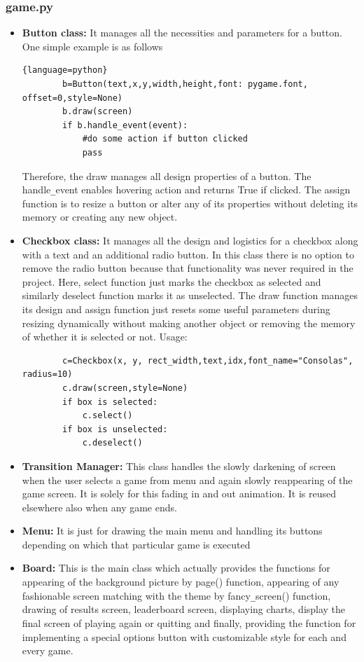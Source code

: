 \documentclass[12pt, a4paper]{article}
\begin{document}
\subsubsection{game.py}
\begin{itemize}
    \item{\textbf{Button class:} It manages all the necessities and parameters for a button. One simple example is as follows
    \begin{lstlisting}{language=python}
        b=Button(text,x,y,width,height,font: pygame.font, offset=0,style=None)
        b.draw(screen)
        if b.handle_event(event):
            #do some action if button clicked
            pass
    \end{lstlisting}
    Therefore, the draw manages all design properties of a button. The handle\texttt{\_}event enables hovering action and returns True if clicked. The assign function is to resize a button or alter any of its properties without deleting its memory or creating any new object.
    }
    \item{\textbf{Checkbox class:}
    It manages all the design and logistics for a checkbox along with a text and an additional radio button. In this class there is no option to remove the radio button because that functionality was never required in the project. Here, select function just marks the checkbox as selected and similarly deselect function marks it as unselected. The draw function manages its design and assign function just resets some useful parameters during resizing dynamically without making another object or removing the memory of whether it is selected or not.
    Usage:
    \begin{lstlisting}
        c=Checkbox(x, y, rect_width,text,idx,font_name="Consolas", radius=10)
        c.draw(screen,style=None)
        if box is selected:
            c.select()
        if box is unselected:
            c.deselect()
    \end{lstlisting}
    }
    \item{\textbf{Transition Manager: }
    This class handles the slowly darkening of screen when the user selects a game from menu and again slowly reappearing of the game screen. It is solely for this fading in and out animation. It is reused elsewhere also when any game ends.
    }
    \item{\textbf{Menu: } It is just for drawing the main menu and handling its buttons depending on which that particular game is executed}
    \item{\textbf{Board: } This is the main class which actually provides the functions for appearing of the background picture by page() function, appearing of any fashionable screen matching with the theme by fancy\texttt{\_}screen() function, drawing of results screen, leaderboard screen, displaying charts, display the final screen of playing again or quitting and finally, providing the function for implementing a special options button with customizable style for each and every game.\\
}
\end{itemize}
\end{document}
